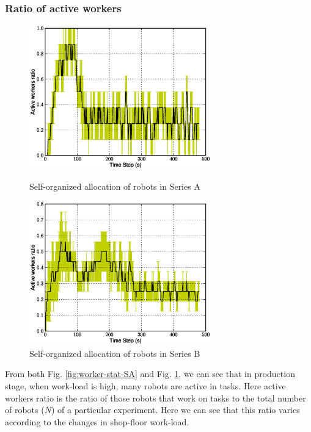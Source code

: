 \documentclass[smallcondensed]{svjour3}
\begin{document}
\subsubsection{Ratio of active workers}
\begin{figure}
\centering
\includegraphics[width=0.7\textwidth, angle=0]
{./Plasticity-8robots2tasks.eps}
\caption{\small Self-organized allocation of robots in Series A}
\label{fig:worker-stat-SA}
%
\centering
\includegraphics[width=0.7\textwidth, angle=0]{./WorkerRatio.eps}
\caption{\small Self-organized allocation of robots in Series B }
\label{fig:worker-stat-SB} %
\end{figure}
From both Fig. \ref{fig:worker-stat-SA} and Fig. \ref{fig:worker-stat-SB}, we can  see that in production stage, when work-load is high, many robots are active in tasks. Here active workers ratio is the ratio of those robots that work on tasks to the total number of robots ($N$) of a particular experiment.   Here we can see that this ratio varies according to the changes in shop-floor work-load.
\end{document}
